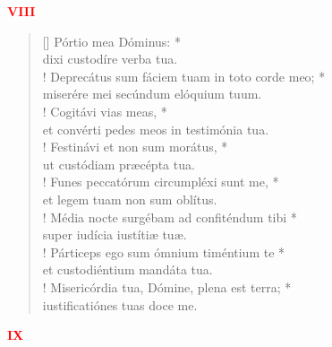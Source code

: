


\def\greinitialformat#1{%
{\fontsize{39}{39}\selectfont #1}%
}




\vspace{0.3cm}
\begin{center}
 \textcolor{red}{\large \bf VIII}
\end{center}
\begin{verse}[\versewidth]
Pórtio mea Dóminus: *\\
dixi custodíre verba tua.\\!
\vin Deprecátus sum fáciem tuam in toto corde meo; *\\
\vin miserére mei secúndum elóquium tuum.\\!
Cogitávi vias meas, *\\
et convérti pedes meos in testimónia tua.\\!
\vin Festinávi et non sum morátus, *\\
\vin ut custódiam præcépta tua.\\!
Funes peccatórum circumpléxi sunt me, *\\
et legem tuam non sum oblítus.\\!
\vin Média nocte surgébam ad confiténdum tibi *\\
\vin super iudícia iustítiæ tuæ.\\!
Párticeps ego sum ómnium timéntium te *\\
et custodiéntium mandáta tua.\\!
\vin Misericórdia tua, Dómine, plena est terra; *\\
\vin iustificatiónes tuas doce me.\\
\end{verse}
\begin{center}
\textcolor{red}{\bf IX}\\
\end{center}
